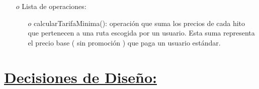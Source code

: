 \documentclass[a4paper]{article}
\begin{document}
\begin{itemize}
{\begin{itemize}
\item[$o$] Lista de operaciones:

\begin{itemize}
\item[$o$]calcularTarifaMinima(): operación que suma los precios de cada hito que pertenecen
a una ruta escogida por un usuario. Esta suma representa el precio base ( sin promoción ) que paga un usuario estándar.
 \end{itemize}
 
 
 \end{itemize}

 
 }


\end{itemize}


\section{\underline{Decisiones de Diseño:} }
\end{document}
